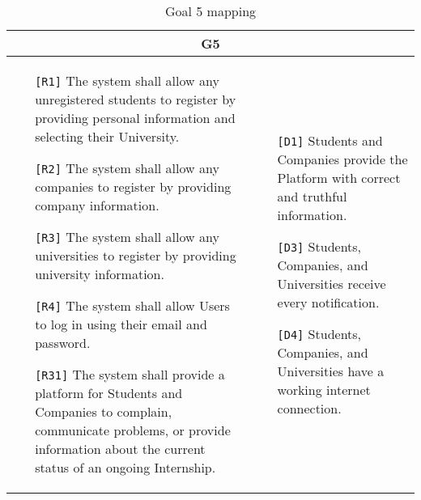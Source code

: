 \begin{table}[H]
 \centering
 \begin{tabular}{|p{8cm}|p{8cm}|}
  \hline
  \multicolumn{2}{|c|}{G5} \\
  \hline
  \begin{itemize}
   \item[\texttt{[R1]}] The system shall allow any unregistered students to register by providing personal information and selecting their University.
   \item[\texttt{[R2]}] The system shall allow any companies to register by providing company information.
   \item[\texttt{[R3]}] The system shall allow any universities to register by providing university information.
   \item[\texttt{[R4]}] The system shall allow Users to log in using their email and password.
   \item[\texttt{[R31]}] The system shall provide a platform for Students and Companies to complain, communicate problems, or provide information about the current status of an ongoing Internship.
  \end{itemize} &
  \begin{itemize}
   \item[\texttt{[D1]}] Students and Companies provide the Platform with correct and truthful information.
   \item[\texttt{[D3]}] Students, Companies, and Universities receive every notification.
   \item[\texttt{[D4]}] Students, Companies, and Universities have a working internet connection.
  \end{itemize} \\ \hline
 \end{tabular}
 \caption{Goal 5 mapping}
 \label{tab:G5}
\end{table}

